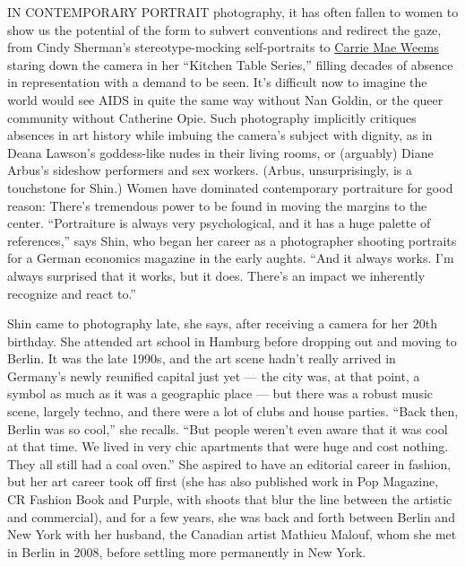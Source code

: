 IN CONTEMPORARY PORTRAIT photography, it has often fallen to women to
show us the potential of the form to subvert conventions and redirect
the gaze, from Cindy Sherman's stereotype-mocking self-portraits to
\href{https://www.nytimes3xbfgragh.onion/2020/07/21/t-magazine/carrie-mae-weems-moma-garden.html}{Carrie
Mae Weems} staring down the camera in her ``Kitchen Table Series,''
filling decades of absence in representation with a demand to be seen.
It's difficult now to imagine the world would see AIDS in quite the same
way without Nan Goldin, or the queer community without Catherine Opie.
Such photography implicitly critiques absences in art history while
imbuing the camera's subject with dignity, as in Deana Lawson's
goddess-like nudes in their living rooms, or (arguably) Diane Arbus's
sideshow performers and sex workers. (Arbus, unsurprisingly, is a
touchstone for Shin.) Women have dominated contemporary portraiture for
good reason: There's tremendous power to be found in moving the margins
to the center. ``Portraiture is always very psychological, and it has a
huge palette of references,'' says Shin, who began her career as a
photographer shooting portraits for a German economics magazine in the
early aughts. ``And it always works. I'm always surprised that it works,
but it does. There's an impact we inherently recognize and react to.''

Shin came to photography late, she says, after receiving a camera for
her 20th birthday. She attended art school in Hamburg before dropping
out and moving to Berlin. It was the late 1990s, and the art scene
hadn't really arrived in Germany's newly reunified capital just yet ---
the city was, at that point, a symbol as much as it was a geographic
place --- but there was a robust music scene, largely techno, and there
were a lot of clubs and house parties. ``Back then, Berlin was so
cool,'' she recalls. ``But people weren't even aware that it was cool at
that time. We lived in very chic apartments that were huge and cost
nothing. They all still had a coal oven.'' She aspired to have an
editorial career in fashion, but her art career took off first (she has
also published work in Pop Magazine, CR Fashion Book and Purple, with
shoots that blur the line between the artistic and commercial), and for
a few years, she was back and forth between Berlin and New York with her
husband, the Canadian artist Mathieu Malouf, whom she met in Berlin in
2008, before settling more permanently in New York.

